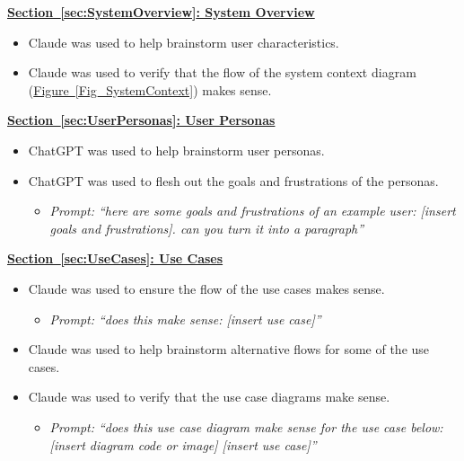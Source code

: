 \documentclass[12pt]{article}
\begin{document}
\textbf{\hyperref[sec:SystemOverview]{Section~\ref*{sec:SystemOverview}: System Overview}}
\begin{itemize}
  \item Claude was used to help brainstorm user characteristics.
  \item Claude was used to verify that the flow of the system context diagram (\hyperref[Fig_SystemContext]{Figure~\ref*{Fig_SystemContext}}) makes sense.
\end{itemize}

\textbf{\hyperref[sec:UserPersonas]{Section~\ref*{sec:UserPersonas}: User Personas}}
\begin{itemize}
  \item ChatGPT was used to help brainstorm user personas.
  \item ChatGPT was used to flesh out the goals and frustrations of the personas.
  \begin{itemize}
    \item \textit{Prompt: ``here are some goals and frustrations of an example user: [insert goals and frustrations]. can you turn it into a paragraph''}
  \end{itemize}
\end{itemize}

\textbf{\hyperref[sec:UseCases]{Section~\ref*{sec:UseCases}: Use Cases}}
\begin{itemize}
  \item Claude was used to ensure the flow of the use cases makes sense.
  \begin{itemize}
    \item \textit{Prompt: ``does this make sense: [insert use case]''}
  \end{itemize}
  \item Claude was used to help brainstorm alternative flows for some of the use cases.
  \item Claude was used to verify that the use case diagrams make sense.
  \begin{itemize}
    \item \textit{Prompt: ``does this use case diagram make sense for the use case below: [insert diagram code or image] [insert use case]''}
  \end{itemize}
\end{itemize}
\end{document}
